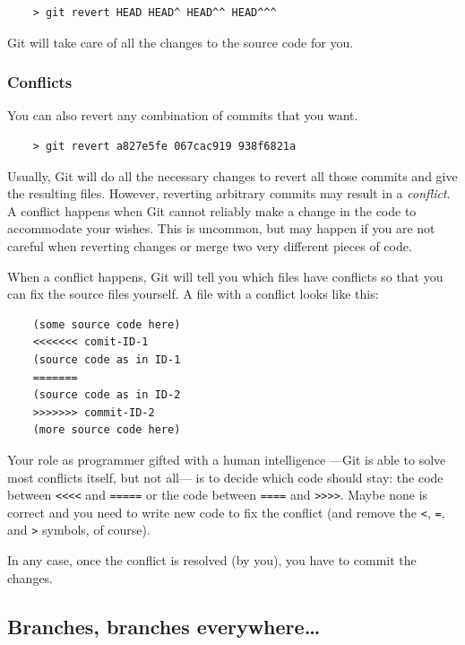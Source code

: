 \begin{verbatim}
    > git revert HEAD HEAD^ HEAD^^ HEAD^^^
\end{verbatim}

Git will take care of all the changes to the source code for you. 

\subsubsection{Conflicts}
\label{sec:conflicts}

You can also revert any combination of commits that you want. 

\begin{verbatim}
    > git revert a827e5fe 067cac919 938f6821a
\end{verbatim}

Usually, Git will do all the necessary changes to revert all those
commits and give the resulting files. 
However, reverting arbitrary commits
may result in a \emph{conflict}. A conflict happens when Git
cannot reliably make a change in the code to accommodate your
wishes. This is uncommon, but may happen if you are not careful when
reverting changes or merge two very different pieces of code. 

When a conflict happens, Git will tell you which files have conflicts
so that you can fix the source files yourself. A file with a conflict
looks like this: 

\begin{verbatim}
    (some source code here)
    <<<<<<< comit-ID-1
    (source code as in ID-1
    =======
    (source code as in ID-2
    >>>>>>> commit-ID-2
    (more source code here)
\end{verbatim}

Your role as programmer gifted with a human intelligence ---Git is
able to solve most conflicts itself, but not all--- is to decide
which code should stay: the code between \verb+<<<<+ and \verb+=====+
or the code between \verb+====+ and \verb+>>>>+. Maybe none is
correct and you need to write new code to fix the conflict (and remove
the \verb+<+, \verb+=+, and \verb+>+ symbols, of course). 

In any case, once the conflict is resolved (by you), 
you have to commit the changes. 


\subsection{Branches, branches everywhere\ldots}
\label{sec:branch-branch-everyw}

